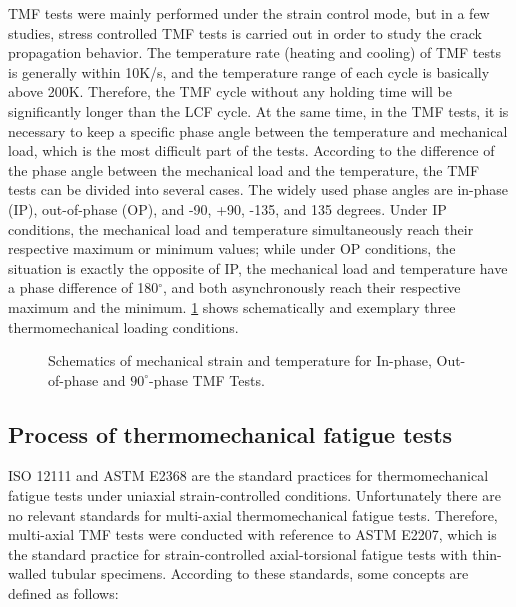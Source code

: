 TMF tests were mainly performed under the strain control mode, but in a few studies, stress controlled TMF tests is carried out in order to study the crack propagation behavior.
The temperature rate (heating and cooling) of TMF tests is generally within 10K/s, and the temperature range of each cycle is basically above 200K. Therefore, the TMF cycle without any holding time will be significantly longer than the LCF cycle. At the same time, in the TMF tests, it is necessary to keep a specific phase angle between the temperature and mechanical load, which is the most difficult part of the tests. According to the difference of the phase angle between the mechanical load and the temperature, the TMF tests can be divided into several cases. The widely used phase angles are in-phase (IP), out-of-phase (OP), and -90, +90, -135, and 135 degrees. Under IP conditions, the mechanical load and temperature simultaneously reach their respective maximum or minimum values; while under OP conditions, the situation is exactly the opposite of IP, the mechanical load and temperature have a phase difference of 180$^\circ$, and both asynchronously reach their respective maximum and the minimum. \ref{Fig:Thermomechanical_phase} shows schematically and exemplary three thermomechanical loading conditions.

\begin{figure}[!htp]
\centering{}
\caption{Schematics of mechanical strain and temperature for In-phase, Out-of-phase and $90^\circ$-phase TMF Tests.}
\label{Fig:Thermomechanical_phase}
\end{figure}

\subsection{Process of thermomechanical fatigue tests}
\noindent
ISO 12111 and ASTM E2368\cite{ASTME2005} are the standard practices for thermomechanical fatigue tests under uniaxial strain-controlled conditions.
Unfortunately there are no relevant standards for multi-axial thermomechanical fatigue tests.
Therefore, multi-axial TMF tests were conducted with reference to ASTM E2207, which is the standard practice for strain-controlled axial-torsional fatigue tests with thin-walled tubular specimens.
According to these standards, some concepts are defined as follows:


